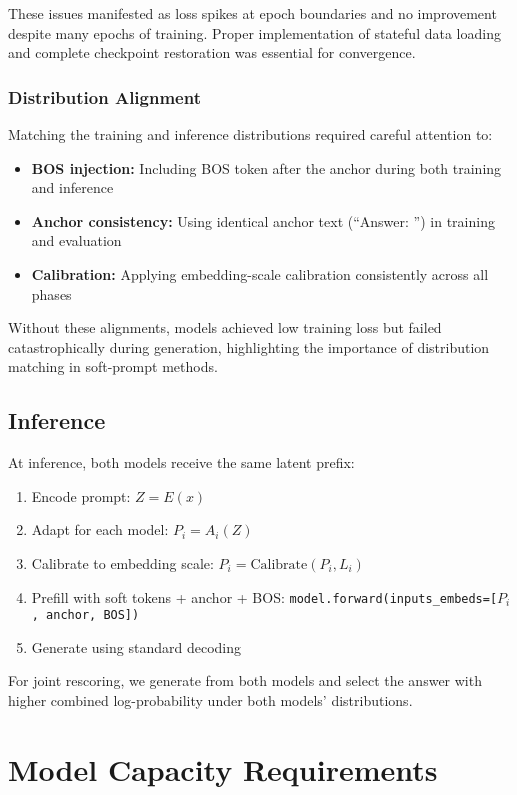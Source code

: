 \documentclass{article}
\begin{document}
These issues manifested as loss spikes at epoch boundaries and no improvement despite many epochs of training. Proper implementation of stateful data loading and complete checkpoint restoration was essential for convergence.

\subsubsection{Distribution Alignment}

Matching the training and inference distributions required careful attention to:
\begin{itemize}
\item \textbf{BOS injection:} Including BOS token after the anchor during both training and inference
\item \textbf{Anchor consistency:} Using identical anchor text (``Answer: '') in training and evaluation
\item \textbf{Calibration:} Applying embedding-scale calibration consistently across all phases
\end{itemize}

Without these alignments, models achieved low training loss but failed catastrophically during generation, highlighting the importance of distribution matching in soft-prompt methods.

\subsection{Inference}

At inference, both models receive the same latent prefix:
\begin{enumerate}
\item Encode prompt: $Z = E(x)$
\item Adapt for each model: $P_i = A_i(Z)$
\item Calibrate to embedding scale: $P_i = \text{Calibrate}(P_i, L_i)$
\item Prefill with soft tokens + anchor + BOS: \texttt{model.forward(inputs\_embeds=[$P_i$, anchor, BOS])}
\item Generate using standard decoding
\end{enumerate}

For joint rescoring, we generate from both models and select the answer with higher combined log-probability under both models' distributions.

\section{Model Capacity Requirements}
\label{sec:capacity}
\end{document}

